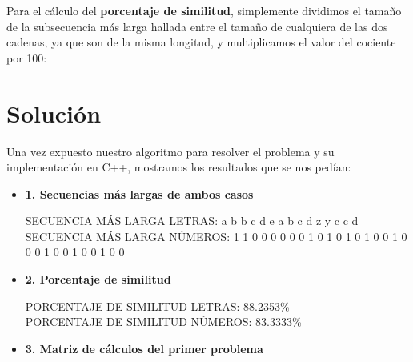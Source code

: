\documentclass[10pt,a4paper]{article}
\begin{document}
\begin{itemize}
	Para el cálculo del \textbf{porcentaje de similitud}, simplemente dividimos el tamaño de la subsecuencia más larga hallada entre el tamaño de cualquiera de las dos cadenas, ya que son de la misma longitud, y multiplicamos el valor del cociente por 100:
	
	
\end{itemize}

\section{Solución}

Una vez expuesto nuestro algoritmo para resolver el problema y su implementación en C++, mostramos los resultados que se nos pedían:

\begin{itemize}
	\item \textbf{1. Secuencias más largas de ambos casos}
	
	\begin{center}
		SECUENCIA MÁS LARGA LETRAS: a b b c d e a b c d z y c c d
		\\
		SECUENCIA MÁS LARGA NÚMEROS: 1 1 0 0 0 0 0 0 1 0 1 0 1 0 1 0 0 1 0 0 0 1 0 0 1 0 0 1 0 0
	\end{center}

	\item \textbf{2. Porcentaje de similitud}
	
	\begin{center}
		PORCENTAJE DE SIMILITUD LETRAS: 88.2353\%
		\\
		PORCENTAJE DE SIMILITUD NÚMEROS: 83.3333\%
	\end{center}

	\item \textbf{3. Matriz de cálculos del primer problema}


\end{itemize}
\end{document}
